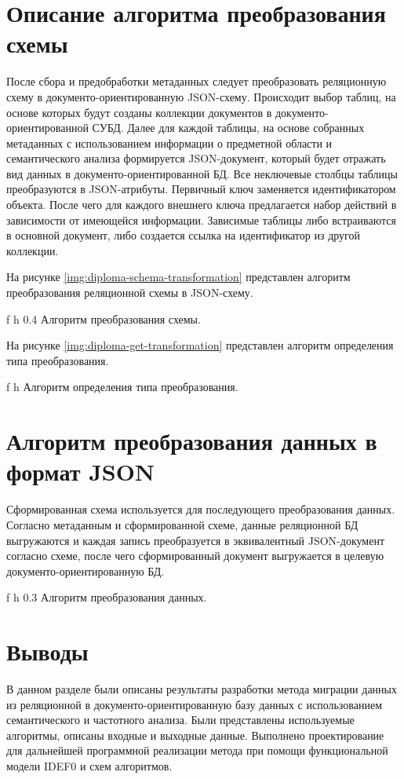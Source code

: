 \section{Описание алгоритма преобразования схемы}
После сбора и предобработки метаданных следует преобразовать реляционную схему в документо-ориентированную JSON-схему.
Происходит выбор таблиц, на основе которых будут созданы коллекции документов в документо-ориентированной СУБД.
Далее для каждой таблицы, на основе собранных метаданных с использованием информации о предметной области и семантического анализа формируется JSON-документ,
который будет отражать вид данных в документо-ориентированной БД.
Все неключевые столбцы таблицы преобразуются в JSON-атрибуты. 
Первичный ключ заменяется идентификатором объекта.
После чего для каждого внешнего ключа предлагается набор действий в зависимости от имеющейся информации.
Зависимые таблицы либо встраиваются в основной документ, либо создается ссылка на идентификатор из другой коллекции.

\clearpage

На рисунке \ref{img:diploma-schema-transformation} представлен алгоритм преобразования реляционной схемы в JSON-схему.

    {f}
    {h}
    {0.4\textwidth}
{Алгоритм преобразования схемы.}

\clearpage

На рисунке \ref{img:diploma-get-transformation} представлен алгоритм определения типа преобразования.

    {f}
    {h}
    {\textwidth}
{Алгоритм определения типа преобразования.}



\clearpage

\section{Алгоритм преобразования данных в формат JSON}
Сформированная схема используется для последующего преобразования данных.
Согласно метаданным и сформированной схеме, 
данные реляционной БД выгружаются и каждая запись преобразуется в эквивалентный JSON-документ согласно схеме,
после чего сформированный документ выгружается в целевую документо-ориентированную БД.

    {f}
    {h}
    {0.3\textwidth}
{Алгоритм преобразования данных.}

\clearpage

\section*{Выводы}
В данном разделе были описаны результаты разработки
метода миграции данных из реляционной в документо-ориентированную базу данных
с использованием семантического и частотного анализа.
Были представлены используемые алгоритмы, описаны входные и выходные данные.
Выполнено проектирование для дальнейшей программной реализации метода при помощи 
функциональной модели IDEF0 и схем алгоритмов.
